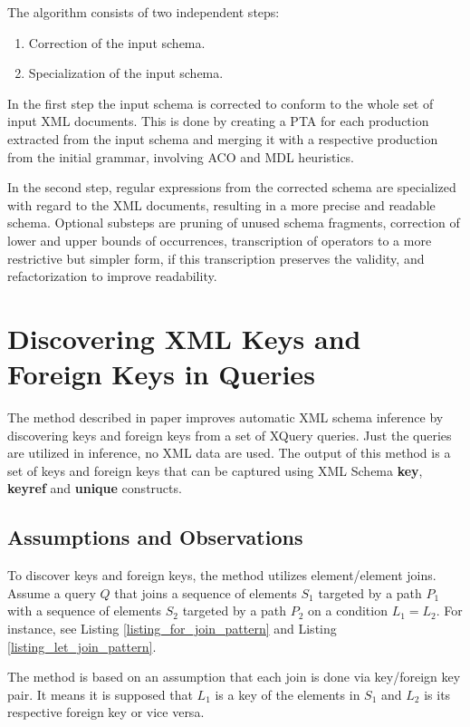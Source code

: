 The algorithm consists of two independent steps:

\begin{enumerate}
\item Correction of the input schema.
\item Specialization of the input schema.
\end{enumerate}

In the first step the input schema is corrected to conform to the whole set of input XML documents. This is done by creating a PTA for each production extracted from the input schema and merging it with a respective production from the initial grammar, involving ACO and MDL heuristics.

In the second step, regular expressions from the corrected schema are specialized with regard to the XML documents, resulting in a more precise and readable schema. Optional substeps are pruning of unused schema fragments, correction of lower and upper bounds of occurrences, transcription of operators to a more restrictive but simpler form, if this transcription preserves the validity, and refactorization to improve readability.

\section{Discovering XML Keys and Foreign Keys in Queries}\label{Keys}
The method described in paper \cite{Necasky:2009:DXK:1529282.1529414} improves automatic XML schema inference by discovering keys and foreign keys from a set of XQuery queries. Just the queries are utilized in inference, no XML data are used. The output of this method is a set of keys and foreign keys that can be captured using XML Schema \textbf{key}, \textbf{keyref} and \textbf{unique} constructs.

\subsection{Assumptions and Observations}
To discover keys and foreign keys, the method utilizes element/element joins. Assume a query $Q$ that joins a sequence of elements $S_1$ targeted by a path $P_1$ with a sequence of elements $S_2$ targeted by a path $P_2$ on a condition $L_1 = L_2$. For instance, see Listing \ref{listing_for_join_pattern} and Listing \ref{listing_let_join_pattern}.

The method is based on an assumption that each join is done via key/foreign key pair. It means it is supposed that $L_1$ is a key of the elements in $S_1$ and $L_2$ is its respective foreign key or vice versa.

